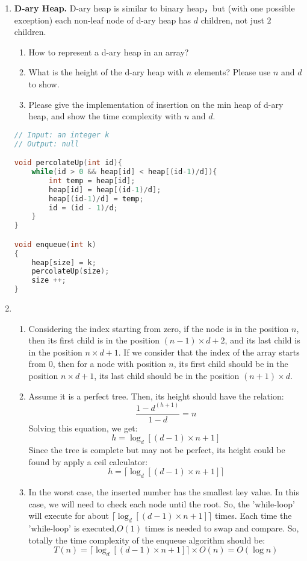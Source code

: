 \documentclass[12pt,a4paper]{article}
\makeatletter
\newtheorem*{solution}{Solution}
\theoremstyle{definition}
\renewenvironment{solution}[1][Solution] {\par\pushQED{\qed}\normalfont\topsep6\p@\@plus6\p@\relax\trivlist\item[\hskip\labelsep\bfseries#1\@addpunct{.}]\ignorespaces}{\popQED\endtrivlist\@endpefalse} \makeatother
\makeatother
\begin{document}
\begin{enumerate}

\item \textbf{D-ary Heap.} D-ary heap is similar to binary heap，but (with one possible exception) each non-leaf node of d-ary heap has $d$ children, not just $2$ children.

\begin{enumerate}
\item How to represent a d-ary heap in an array?
\item What is the height of the d-ary heap with $n$ elements? Please use $n$ and $d$ to show.
\item Please give the implementation of insertion on the min heap of d-ary heap, and show the time complexity with $n$ and $d$.
\end{enumerate}

\begin{lstlisting}[language=C++]
// Input: an integer k
// Output: null

void percolateUp(int id){
    while(id > 0 && heap[id] < heap[(id-1)/d]){
        int temp = heap[id];
        heap[id] = heap[(id-1)/d];
        heap[(id-1)/d] = temp;
        id = (id - 1)/d;
    }
}

void enqueue(int k)
{
	heap[size] = k;
	percolateUp(size);
	size ++;
}
\end{lstlisting}

\begin{solution}
\begin{enumerate}
    \item Considering the index starting from zero, if the node is in the position $n$, then its first child is in the position $(n-1)\times d+2$, and its last child is in the position $n\times d+1$.
    If we consider that the index of the array starts from 0, then for a node with position $n$, its first child should be in the position $n\times d+1$, its last child should be in the position $(n+1)\times d$.
    \item Assume it is a perfect tree. Then, its height should have the relation:
    $$\frac{1-d^{(h+1)}}{1-d}=n$$
    Solving this equation, we get:
    $$h=\log _d [(d-1)\times n+1]$$
    Since the tree is complete but may not be perfect, its height could be found by apply a ceil calculator:
    $$h=\lceil {\log _d [(d-1)\times n+1]} \rceil$$
    \item In the worst case, the inserted number has the smallest key value. In this case, we will need to check each node until the root. So, the 'while-loop' will execute for about $\lceil {\log _d [(d-1)\times n+1]} \rceil$ times. Each time the 'while-loop' is executed,$O(1)$ times is needed to swap and compare. So, totally the time complexity of the enqueue algorithm should be:
    $$T(n) = \lceil {\log _d [(d-1)\times n+1]} \rceil \times O(n)=O(\log n)$$
\end{enumerate}
\end{solution}


\end{enumerate}
\end{document}
